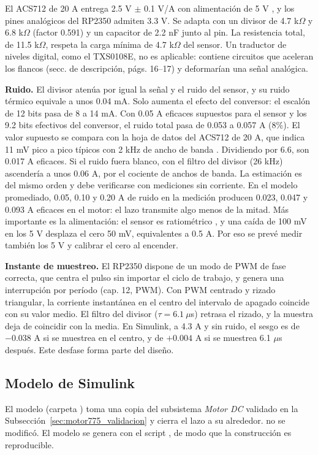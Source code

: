 El ACS712 de 20 A entrega 2.5 V $\pm$ 0.1 V/A con alimentación de 5 V \cite{acs712}, y los pines analógicos del RP2350 admiten 3.3 V. Se adapta con un divisor de 4.7 k$\Omega$ y 6.8 k$\Omega$ (factor 0.591) y un capacitor de 2.2 nF junto al pin. La resistencia total, de 11.5 k$\Omega$, respeta la carga mínima de 4.7 k$\Omega$ del sensor. Un traductor de niveles digital, como el TXS0108E, no es aplicable: contiene circuitos que aceleran los flancos \cite{txs0108e} (secc. de descripción, págs. 16--17) y deformarían una señal analógica.

\textbf{Ruido.} El divisor atenúa por igual la señal y el ruido del sensor, y su ruido térmico equivale a unos 0.04 mA. Solo aumenta el efecto del conversor: el escalón de 12 bits pasa de 8 a 14 mA. Con 0.05 A eficaces supuestos para el sensor y los 9.2 bits efectivos del conversor, el ruido total pasa de 0.053 a 0.057 A (8\%). El valor supuesto se compara con la hoja de datos del ACS712 de 20 A, que indica 11 mV pico a pico típicos con 2 kHz de ancho de banda \cite{acs712}. Dividiendo por 6.6, son 0.017 A eficaces. Si el ruido fuera blanco, con el filtro del divisor (26 kHz) ascendería a unos 0.06 A, por el cociente de anchos de banda. La estimación es del mismo orden y debe verificarse con mediciones sin corriente. En el modelo promediado, 0.05, 0.10 y 0.20 A de ruido en la medición producen 0.023, 0.047 y 0.093 A eficaces en el motor: el lazo transmite algo menos de la mitad. Más importante es la alimentación: el sensor es ratiométrico \cite{acs712}, y una caída de 100 mV en los 5 V desplaza el cero 50 mV, equivalentes a 0.5 A. Por eso se prevé medir también los 5 V y calibrar el cero al encender.

\textbf{Instante de muestreo.} El RP2350 dispone de un modo de PWM de fase correcta, que centra el pulso sin importar el ciclo de trabajo, y genera una interrupción por período \cite{rp2350} (cap. 12, PWM). Con PWM centrado y rizado triangular, la corriente instantánea en el centro del intervalo de apagado coincide con su valor medio. El filtro del divisor ($\tau = 6.1\ \mu$s) retrasa el rizado, y la muestra deja de coincidir con la media. En Simulink, a 4.3 A y sin ruido, el sesgo es de $-0.038$ A si se muestrea en el centro, y de $+0.004$ A si se muestrea 6.1 $\mu$s después. Este desfase forma parte del diseño.

\subsection{Modelo de Simulink}
\label{sec:cc_simulink}
El modelo  (carpeta ) toma una copia del subsistema \emph{Motor DC} validado en la Subsección~\ref{sec:motor775_validacion} y cierra el lazo a su alrededor.  no se modificó. El modelo se genera con el script , de modo que la construcción es reproducible.

